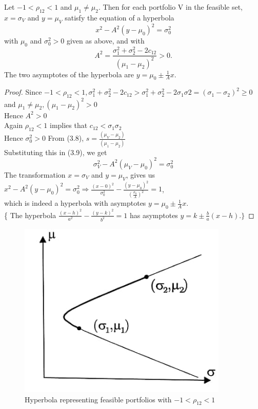 \begin{theorem}
Let $-1<\rho_{12}<1$ and $\mu_{1} \neq \mu_{2}$. Then for each portfolio V in the feasible set, $x=\sigma_{V}$ and $y=\mu_{V}$ satisfy the equation of a hyperbola 
\begin{equation}
x^{2}-A^{2}(y-\mu_{0})^{2}=\sigma_{0}^{2}
\end{equation}
with $\mu_{0}$ and $\sigma_{0}^{2}>0$ given as above, and with $$A^2=\frac{\sigma_{1}^{2}+\sigma_{2}^{2}-2c_{12}}{(\mu_{1}-\mu_{2})^{2}}>0.$$ The two asymptotes of the hyperbola are $y=\mu_{0}\pm \frac{1}{A}x.$
\end{theorem}
\begin{proof}
    Since $-1<\rho_{12}<1, \sigma_{1}^{2}+\sigma_{2}^{2}-2c_{12} > \sigma_{1}^{2}+\sigma_{2}^{2}-2\sigma_{1}\sigma{2} = (\sigma_{1}-\sigma_{2})^{2} \geq 0$
    \\and $\mu_{1} \neq \mu_{2}, (\mu_{1}-\mu_{2})^{2}>0$
    \\Hence $A^{2}>0$
    \\Again  $\rho_{12}<1$ implies that $c_{12}<\sigma_{1}\sigma_{2}$
    \\Hence $\sigma_{0}^{2}>0$
    From (3.8), $s= \frac{(\mu_{V}-\mu_{2})}{(\mu_{1}-\mu_{2})}$
    \\Substituting this in (3.9), we get $$\sigma_{V}^{2}-A^{2}(\mu_{V}-\mu_{0})^{2}=\sigma_{0}^{2}$$
    The transformation $x=\sigma_{V}$ and $y=\mu_{V}$, gives us \\$x^{2}-A^{2}(y-\mu_{0})^{2}=\sigma_{0}^{2} \Rightarrow \frac{(x-0)^{2}}{\sigma_{0}^{2}}-\frac{(y-\mu_{0})^{2}}{(\frac{\sigma_{0}}{A})^{2}}=1$, 
    \\which is indeed a hyperbola with asymptotes $y=\mu_{0}\pm \frac{1}{A}x.$
    \\\{ The hyperbola $\frac{(x-h)^{2}}{a^{2}}-\frac{(y-k)^{2}}{b^{2}}=1 $ has asymptotes $y=k\pm \frac{b}{a}(x-h).\}$
\end{proof}
\begin{figure}[htp]
    \centering
    \includegraphics[width=10cm]{4.jpg}
    \caption{Hyperbola representing feasible portfolios with $-1<\rho_{12}<1$}
    \label{fig:SI}
\end{figure}

